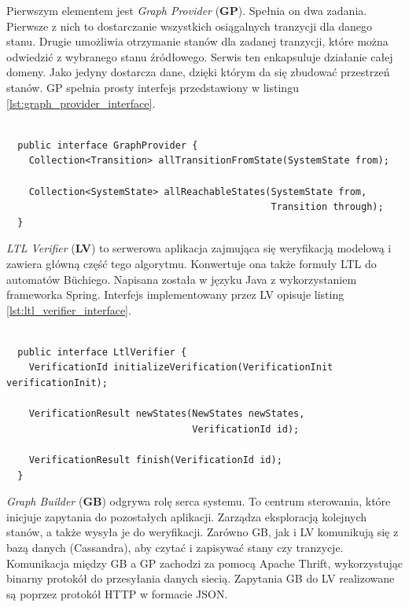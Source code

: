 Pierwszym elementem jest \textit{Graph Provider} (\textbf{GP}).
Spełnia on dwa zadania.
Pierwsze z nich to dostarczanie wszystkich osiągalnych tranzycji dla danego stanu.
Drugie umożliwia otrzymanie stanów dla zadanej tranzycji, które można odwiedzić z wybranego stanu źródłowego.
Serwis ten enkapsuluje działanie całej domeny.
Jako jedyny dostarcza dane, dzięki którym da się zbudować przestrzeń stanów.
GP spełnia prosty interfejs przedstawiony w listingu \ref{lst:graph_provider_interface}.

\begin{minipage}{\linewidth}
\begin{lstlisting}[caption={Interfejs implementowany przez GP.},captionpos=b,label={lst:graph_provider_interface}]

  public interface GraphProvider {
    Collection<Transition> allTransitionFromState(SystemState from);

    Collection<SystemState> allReachableStates(SystemState from,
                                               Transition through);
  }
\end{lstlisting}
\end{minipage}

\textit{LTL Verifier} (\textbf{LV}) to serwerowa aplikacja zajmująca się weryfikacją modelową i zawiera główną część tego algorytmu.
Konwertuje ona także formuły LTL do automatów Büchiego.
Napisana została w języku Java z wykorzystaniem frameworka Spring.
Interfejs implementowany przez LV opisuje listing \ref{lst:ltl_verifier_interface}.

\begin{lstlisting}[caption={Interfejs implementowany przez LV.},captionpos=b,label={lst:ltl_verifier_interface}]

  public interface LtlVerifier {
    VerificationId initializeVerification(VerificationInit verificationInit);

    VerificationResult newStates(NewStates newStates,
                                 VerificationId id);

    VerificationResult finish(VerificationId id);
  }
\end{lstlisting}

\textit{Graph Builder} (\textbf{GB}) odgrywa rolę serca systemu.
To centrum sterowania, które inicjuje zapytania do pozostałych aplikacji.
Zarządza eksploracją kolejnych stanów, a także wysyła je do weryfikacji.
Zarówno GB, jak i LV komunikują się z bazą danych (Cassandra), aby czytać i zapisywać stany czy tranzycje.
Komunikacja między GB a GP zachodzi za pomocą Apache Thrift, wykorzystując binarny protokół do  przesyłania danych siecią.
Zapytania GB do LV realizowane są poprzez protokół HTTP w formacie JSON.

